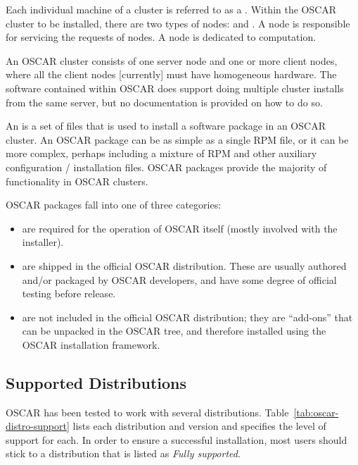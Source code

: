 Each individual machine of a cluster is referred to as a .
Within the OSCAR cluster to be installed, there are two types of
nodes:  and . A  node is
responsible for servicing the requests of  nodes.  A
 node is dedicated to computation.  

An OSCAR cluster consists of one server node and one or more client
nodes, where all the client nodes [currently] must have homogeneous
hardware.  The software contained within OSCAR does support doing
multiple cluster installs from the same server, but no documentation
is provided on how to do so.

An  is a set of files that is used to install a
software package in an OSCAR cluster.  An OSCAR package can be as
simple as a single RPM file, or it can be more complex, perhaps
including a mixture of RPM and other auxiliary configuration /
installation files.  OSCAR packages provide the majority of
functionality in OSCAR clusters.  

OSCAR packages fall into one of three categories:

\begin{itemize}
\item {} are required for the operation of OSCAR
  itself (mostly involved with the installer).
  
\item {} are shipped in the official OSCAR
  distribution.  These are usually authored and/or packaged by OSCAR
  developers, and have some degree of official testing before
  release.
  
\item {} are not included in the official
  OSCAR distribution; they are ``add-ons'' that can be unpacked in the
  OSCAR tree, and therefore installed using the OSCAR installation
  framework.  
\end{itemize}


\subsection{Supported Distributions}

OSCAR has been tested to work with several distributions.
Table~\ref{tab:oscar-distro-support} lists each distribution and
version and specifies the level of support for each. In order to
ensure a successful installation, most users should stick to a
distribution that is listed as \emph{Fully supported}.

